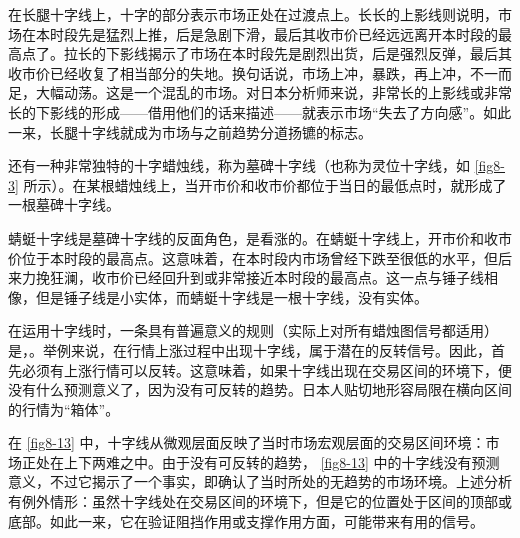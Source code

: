 在长腿十字线上，十字的部分表示市场正处在过渡点上。长长的上影线则说明，市场在本时段先是猛烈上推，后是急剧下滑，最后其收市价已经远远离开本时段的最高点了。拉长的下影线揭示了市场在本时段先是剧烈出货，后是强烈反弹，最后其收市价已经收复了相当部分的失地。换句话说，市场上冲，暴跌，再上冲，不一而足，大幅动荡。这是一个混乱的市场。对日本分析师来说，非常长的上影线或非常长的下影线的形成——借用他们的话来描述——就表示市场“失去了方向感”。如此一来，长腿十字线就成为市场与之前趋势分道扬镳的标志。

还有一种非常独特的十字蜡烛线，称为墓碑十字线（也称为灵位十字线，如 \autoref{fig8-3} 所示）。在某根蜡烛线上，当开市价和收市价都位于当日的最低点时，就形成了一根墓碑十字线。



蜻蜓十字线是墓碑十字线的反面角色，是看涨的。在蜻蜓十字线上，开市价和收市价位于本时段的最高点。这意味着，在本时段内市场曾经下跌至很低的水平，但后来力挽狂澜，收市价已经回升到或非常接近本时段的最高点。这一点与锤子线相像，但是锤子线是小实体，而蜻蜓十字线是一根十字线，没有实体。

在运用十字线时，一条具有普遍意义的规则（实际上对所有蜡烛图信号都适用）是，。举例来说，在行情上涨过程中出现十字线，属于潜在的反转信号。因此，首先必须有上涨行情可以反转。这意味着，如果十字线出现在交易区间的环境下，便没有什么预测意义了，因为没有可反转的趋势。日本人贴切地形容局限在横向区间的行情为“箱体”。

在 \autoref{fig8-13} 中，十字线从微观层面反映了当时市场宏观层面的交易区间环境：市场正处在上下两难之中。由于没有可反转的趋势， \autoref{fig8-13} 中的十字线没有预测意义，不过它揭示了一个事实，即确认了当时所处的无趋势的市场环境。上述分析有例外情形：虽然十字线处在交易区间的环境下，但是它的位置处于区间的顶部或底部。如此一来，它在验证阻挡作用或支撑作用方面，可能带来有用的信号。


